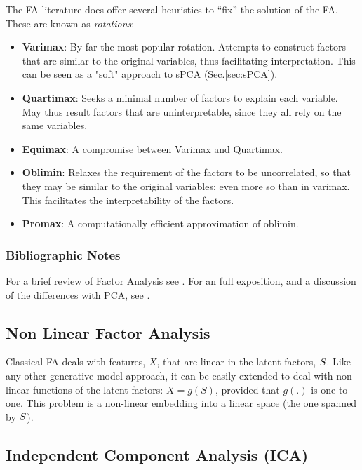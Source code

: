 \documentclass[12pt,a4paper]{article}
\begin{document}
The FA literature does offer several heuristics to ``fix'' the solution of the FA. 
These are known as \emph{rotations}:
\begin{itemize}
	\item \textbf{Varimax}: 
	By far the most popular rotation. Attempts to construct factors that are similar to the original variables, thus facilitating interpretation. 
	This can be seen as a "soft" approach to sPCA (Sec.\ref{sec:sPCA}).
	
	\item \textbf{Quartimax}: 
	Seeks a minimal number of factors to explain each variable. 
	May thus result factors that are uninterpretable, since they all rely on the same variables.
	
	\item \textbf{Equimax}: A compromise between Varimax and Quartimax. 
	
	\item \textbf{Oblimin}: 
	Relaxes the requirement of the factors to be uncorrelated, so that they may be similar to the original variables; even more so than in varimax. 
	This facilitates the interpretability of the factors. 
	
	\item \textbf{Promax}: 
	A computationally efficient approximation of oblimin.
\end{itemize}

\subsubsection{Bibliographic Notes}
For a brief review of Factor Analysis see \cite{friedman2001elements}.
For an full exposition, and a discussion of the differences with PCA, see \cite{jolliffe2002principal}.


\subsection{Non Linear Factor Analysis}
Classical FA deals with features, $X$, that are linear in the latent factors, $S$. 
Like any other generative model approach, it can be easily extended to deal with non-linear functions of the latent factors: $X=g(S)$, provided that $g(.)$ is one-to-one. 
This problem is a non-linear embedding into a linear space (the one spanned by $S$).





\subsection{Independent Component Analysis (ICA)}
\label{sec:ica}
\end{document}
